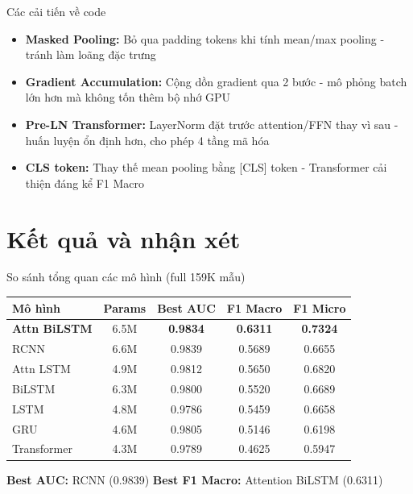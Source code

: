 \documentclass[serif, aspectratio=169]{beamer}
\begin{document}
\begin{frame}{Các cải tiến về code}
\begin{itemize}
    \item \textbf{Masked Pooling:} Bỏ qua padding tokens khi tính mean/max pooling - tránh làm loãng đặc trưng
    \item \textbf{Gradient Accumulation:} Cộng dồn gradient qua 2 bước - mô phỏng batch lớn hơn mà không tốn thêm bộ nhớ GPU
    \item \textbf{Pre-LN Transformer:} LayerNorm đặt trước attention/FFN thay vì sau - huấn luyện ổn định hơn, cho phép 4 tầng mã hóa
    \item \textbf{CLS token:} Thay thế mean pooling bằng [CLS] token - Transformer cải thiện đáng kể F1 Macro
\end{itemize}
\end{frame}

\section{Kết quả và nhận xét}

\begin{frame}{So sánh tổng quan các mô hình (full 159K mẫu)}
\begin{table}
\centering
\small
\begin{tabular}{lcccc}
\toprule
\textbf{Mô hình} & \textbf{Params} & \textbf{Best AUC} & \textbf{F1 Macro} & \textbf{F1 Micro} \\
\midrule
\textbf{Attn BiLSTM} & 6.5M & \textbf{0.9834} & \textbf{0.6311} & \textbf{0.7324} \\
RCNN & 6.6M & 0.9839 & 0.5689 & 0.6655 \\
Attn LSTM & 4.9M & 0.9812 & 0.5650 & 0.6820 \\
BiLSTM & 6.3M & 0.9800 & 0.5520 & 0.6689 \\
LSTM & 4.8M & 0.9786 & 0.5459 & 0.6658 \\
GRU & 4.6M & 0.9805 & 0.5146 & 0.6198 \\
Transformer & 4.3M & 0.9789 & 0.4625 & 0.5947 \\
\bottomrule
\end{tabular}
\end{table}
\vspace{0.2cm}
\textbf{Best AUC:} RCNN (0.9839) \quad \textbf{Best F1 Macro:} Attention BiLSTM (0.6311)
\end{frame}
\end{document}
